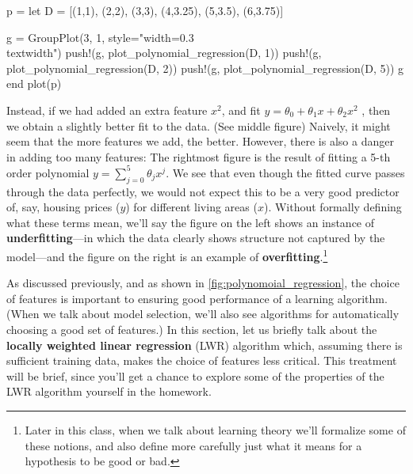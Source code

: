 \begin{figure*}
    \caption{
        \label{fig:polynomoial_regression} Polynomial regression with different $k$-order fits.
    }
    \begin{jlcode}
    p = let
        D = [(1,1), (2,2), (3,3), (4,3.25), (5,3.5), (6,3.75)]

        g = GroupPlot(3, 1, style="width=0.3\\textwidth")
        push!(g, plot_polynomial_regression(D, 1))
        push!(g, plot_polynomial_regression(D, 2))
        push!(g, plot_polynomial_regression(D, 5))
        g
    end
    plot(p)
    \end{jlcode}
    \begin{center}
    \end{center}
\end{figure*}

Instead, if we had added an extra feature $x^2$, and fit $y = \theta_0 + \theta_1 x + \theta_2 x^2$ ,
then we obtain a slightly better fit to the data. (See middle figure) Naively, it
might seem that the more features we add, the better. However, there is also
a danger in adding too many features: The rightmost figure is the result of
fitting a 5-th order polynomial $y = \sum_{j=0}^5 \theta_j x^j$. We see that even though the
fitted curve passes through the data perfectly, we would not expect this to
be a very good predictor of, say, housing prices ($y$) for different living areas
($x$). Without formally defining what these terms mean, we'll say the figure
on the left shows an instance of \textbf{underfitting}---in which the data clearly
shows structure not captured by the model---and the figure on the right is
an example of \textbf{overfitting}.\footnote{Later in this class, when we talk about learning
theory we'll formalize some of these notions, and also define more carefully
just what it means for a hypothesis to be good or bad.} %

As discussed previously, and as shown in \cref{fig:polynomoial_regression}, the choice of %
features is important to ensuring good performance of a learning algorithm.
(When we talk about model selection, we'll also see algorithms for automatically
choosing a good set of features.) In this section, let us briefly talk
about the \textbf{locally weighted linear regression} (LWR) algorithm which, assuming
there is sufficient training data, makes the choice of features less critical.
This treatment will be brief, since you'll get a chance to explore some of the
properties of the LWR algorithm yourself in the homework.

